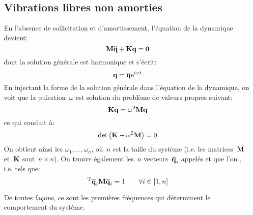 \medskip
\subsection{Vibrations libres non amorties}

En l'absence de sollicitation et d'amortissement, l'équation de la dynamique devient:
\begin{equation} \MM{M}\VV{\ddot{q}}+\MM{K}\VV{q}=\VV{0} \end{equation}
dont la solution générale est harmonique et s'écrit:
\begin{equation} \VV{q}=\VV{\overline{q}}\mathrm{e}^{i\omega t} \end{equation}
En injectant la forme de la solution générale dans l'équation de la dynamique, on voit que la pulsation~$\omega$ est solution du problème de valeurs propres suivant:
\begin{equation} \MM{K}\VV{\overline{q}}=\omega^2\MM{M}\VV{\overline{q}} \end{equation}
ce qui conduit à:
\begin{equation} \det\left(\MM{K}-\omega^2\MM{M}\right)=0\end{equation}
\medskipvm
On obtient ainsi les 
$\omega_1,\ldots,\omega_n$, où~$n$ est la taille du système (i.e. les matrices~$\MM{M}$ et~$\MM{K}$ sont~$n\times n$).
\medskipvm
On trouve également les~$n$ vecteurs~$\VV{\overline{q}}_i$ appelés  et que l'on , i.e. tels que:
\begin{equation} \LL{\overline{q}}_i\MM{M}\VV{\overline{q}}_i=1 \qquad \forall i\in[1,n] \end{equation}
\medskipvm
{}

De toutes façons, ce sont les premières fréquences qui déterminent le comportement du système.

\medskip
{}

